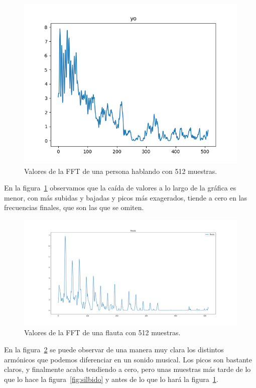 \documentclass[a4paper, 12pt]{book}
\begin{document}
\begin{figure}
	\centering
	\includegraphics[width=12cm, keepaspectratio]{img/yo512.png}
	\caption{Valores de la FFT de una persona hablando con 512 muestras.}\label{fig:yo}
\end{figure}

En la figura~\ref{fig:yo} observamos que la caída de valores a lo largo de la gráfica es menor, con más subidas y bajadas y picos más exagerados, tiende a cero en las frecuencias finales, que son las que se omiten.

\begin{figure}
	\centering
	\includegraphics[width=12cm, keepaspectratio]{img/flauta512.png}
	\caption{Valores de la FFT de una flauta con 512 muestras.}\label{fig:flauta}
\end{figure}

En la figura~\ref{fig:flauta} se puede observar de una manera muy clara los distintos armónicos que podemos diferenciar en un sonido musical. Los picos son bastante claros, y finalmente acaba tendiendo a cero, pero unas muestras más tarde de lo que lo hace la figura~\ref{fig:silbido} y antes de lo que lo hará la figura~\ref{fig:yo}.
\end{document}
